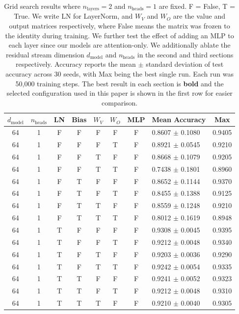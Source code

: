 \begin{table}
\caption{
Grid search results where $n_\text{layers}=2$ and $n_\text{heads}=1$ are fixed. F = False, T = True. 
We write LN for LayerNorm, and $W_V$ and $W_O$ are the value and output matrices respectively, where False means the matrix was frozen to the identity during training. 
We further test the effect of adding an MLP to each layer since our models are attention-only.
We additionally ablate the residual stream dimension $d_\text{model}$ and $n_\text{heads}$ in the second and third sections respectively.
Accuracy reports the mean $\pm$ standard deviation of test accuracy across 30 seeds, with Max being the best single run. Each run was 50,000 training steps. The best result in each section is \textbf{bold} and the selected configuration used in this paper is shown in the first row for easier comparison.
}
\label{tab:params-grid-search}
\centering
\setlength{\tabcolsep}{3pt}
\begin{tabular}{c c c c c c c l c}
\toprule
$d_\text{model}$ & $n_\text{heads}$ & LN & Bias & $W_V$ & $W_O$ & MLP & Mean Accuracy & Max \\
\midrule
64 & 1 & F & F & F & F & F & 0.8607 $\pm$ 0.1080 & 0.9405 \\
\midrule
64 & 1 & F & F & F & T & F & 0.8921 $\pm$ 0.0545 & 0.9210 \\
64 & 1 & F & F & T & F & F & 0.8668 $\pm$ 0.1079 & 0.9205 \\
64 & 1 & F & F & T & T & F & 0.7438 $\pm$ 0.1801 & 0.8960 \\
64 & 1 & F & T & F & F & F & 0.8652 $\pm$ 0.1144 & 0.9370 \\
64 & 1 & F & T & F & T & F & 0.8455 $\pm$ 0.1388 & 0.9125 \\
64 & 1 & F & T & T & F & F & 0.8559 $\pm$ 0.1248 & 0.9210 \\
64 & 1 & F & T & T & T & F & 0.8012 $\pm$ 0.1619 & 0.8948 \\
64 & 1 & T & F & F & F & F & 0.9308 $\pm$ 0.0045 & 0.9395 \\
64 & 1 & T & F & F & T & F & 0.9212 $\pm$ 0.0048 & 0.9340 \\
64 & 1 & T & F & T & F & F & 0.9203 $\pm$ 0.0036 & 0.9290 \\
64 & 1 & T & F & T & T & F & 0.9242 $\pm$ 0.0054 & 0.9335 \\
64 & 1 & T & T & F & F & F & 0.9241 $\pm$ 0.0052 & 0.9323 \\
64 & 1 & T & T & F & T & F & 0.9212 $\pm$ 0.0048 & 0.9310 \\
64 & 1 & T & T & T & F & F & 0.9210 $\pm$ 0.0040 & 0.9305 \\

\end{tabular}
\end{table}
